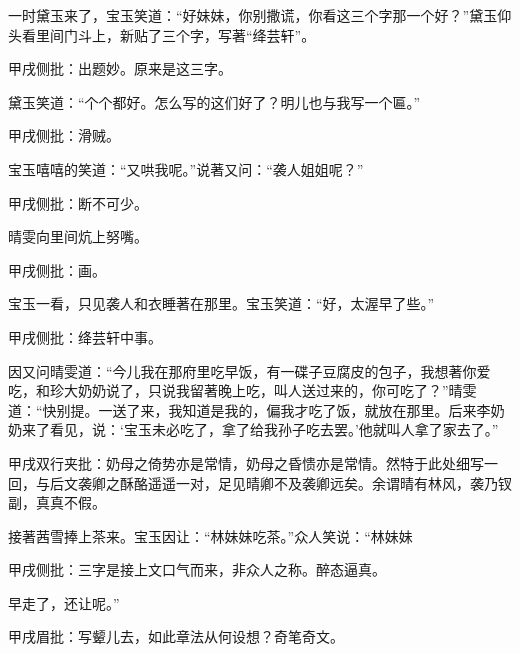 \begin{parag}
    一时黛玉来了，宝玉笑道：“好妹妹，你别撒谎，你看这三个字那一个好？”黛玉仰头看里间门斗上，新贴了三个字，写著“绛芸轩”。\begin{note}甲戌侧批：出题妙。原来是这三字。\end{note}黛玉笑道：“个个都好。怎么写的这们好了？明儿也与我写一个匾。”\begin{note}甲戌侧批：滑贼。\end{note}宝玉嘻嘻的笑道：“又哄我呢。”说著又问：“袭人姐姐呢？”\begin{note}甲戌侧批：断不可少。\end{note}晴雯向里间炕上努嘴。\begin{note}甲戌侧批：画。\end{note}宝玉一看，只见袭人和衣睡著在那里。宝玉笑道：“好，太渥早了些。”\begin{note}甲戌侧批：绛芸轩中事。\end{note}因又问晴雯道：“今儿我在那府里吃早饭，有一碟子豆腐皮的包子，我想著你爱吃，和珍大奶奶说了，只说我留著晚上吃，叫人送过来的，你可吃了？”晴雯道：“快别提。一送了来，我知道是我的，偏我才吃了饭，就放在那里。后来李奶奶来了看见，说：‘宝玉未必吃了，拿了给我孙子吃去罢。’他就叫人拿了家去了。”\begin{note}甲戌双行夹批：奶母之倚势亦是常情，奶母之昏愦亦是常情。然特于此处细写一回，与后文袭卿之酥酪遥遥一对，足见晴卿不及袭卿远矣。余谓晴有林风，袭乃钗副，真真不假。\end{note}接著茜雪捧上茶来。宝玉因让：“林妹妹吃茶。”众人笑说：“林妹妹\begin{note}甲戌侧批：三字是接上文口气而来，非众人之称。醉态逼真。\end{note}早走了，还让呢。”\begin{note}甲戌眉批：写颦儿去，如此章法从何设想？奇笔奇文。\end{note}
\end{parag}



